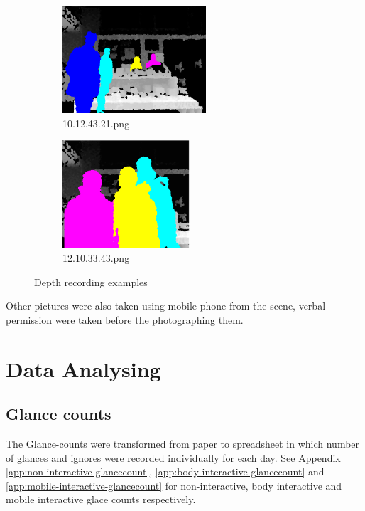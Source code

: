 \begin{enumerate}
\begin{figure}[H]
    \centering
    \begin{subfigure}[H]{0.45\textwidth}
        \centering
        \includegraphics[width=\textwidth,height=4cm]{Figures/8/d1}
        \caption{10.12.43.21.png}
        \label{fig:d1}
    \end{subfigure}
    \begin{subfigure}[H]{0.45\textwidth}
        \centering
        \includegraphics[width=\textwidth,height=4cm]{Figures/8/d2}
        \caption{12.10.33.43.png}
        \label{fig:d2}
    \end{subfigure}
    \caption{Depth recording examples}
    \label{fig:DepthRecordedImages}
\end{figure}




\end{enumerate}

Other pictures were also taken using mobile phone from the scene, verbal permission were taken before the photographing them.


\section{Data Analysing}

\subsection {Glance counts} 
The Glance-counts were transformed from paper to spreadsheet in which number of glances and ignores were recorded individually for each day. See Appendix \ref{app:non-interactive-glancecount}, \ref{app:body-interactive-glancecount} and \ref{app:mobile-interactive-glancecount} for non-interactive, body interactive and mobile interactive glace counts respectively.

